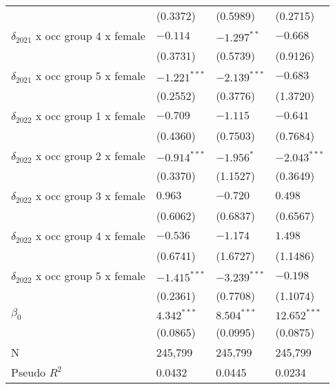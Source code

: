 \begin{tabular}{llll}
                                       &           (0.3372) &           (0.5989) &           (0.2715) \\
$\delta_{2021}$ x occ group 4 x female &           $-0.114$ &      $-1.297^{**}$ &           $-0.668$ \\
                                       &           (0.3731) &           (0.5739) &           (0.9126) \\
$\delta_{2021}$ x occ group 5 x female &     $-1.221^{***}$ &     $-2.139^{***}$ &           $-0.683$ \\
                                       &           (0.2552) &           (0.3776) &           (1.3720) \\
$\delta_{2022}$ x occ group 1 x female &           $-0.709$ &           $-1.115$ &           $-0.641$ \\
                                       &           (0.4360) &           (0.7503) &           (0.7684) \\
$\delta_{2022}$ x occ group 2 x female &     $-0.914^{***}$ &         $-1.956^*$ &     $-2.043^{***}$ \\
                                       &           (0.3370) &           (1.1527) &           (0.3649) \\
$\delta_{2022}$ x occ group 3 x female &            $0.963$ &           $-0.720$ &            $0.498$ \\
                                       &           (0.6062) &           (0.6837) &           (0.6567) \\
$\delta_{2022}$ x occ group 4 x female &           $-0.536$ &           $-1.174$ &            $1.498$ \\
                                       &           (0.6741) &           (1.6727) &           (1.1486) \\
$\delta_{2022}$ x occ group 5 x female &     $-1.415^{***}$ &     $-3.239^{***}$ &           $-0.198$ \\
                                       &           (0.2361) &           (0.7708) &           (1.1074) \\
$\beta_0$                              &      $4.342^{***}$ &      $8.504^{***}$ &     $12.652^{***}$ \\
                                       &           (0.0865) &           (0.0995) &           (0.0875) \\
N                                      &            245,799 &            245,799 &            245,799 \\
Pseudo $R^2$                           &             0.0432 &             0.0445 &             0.0234 \\
\bottomrule
\end{tabular}
